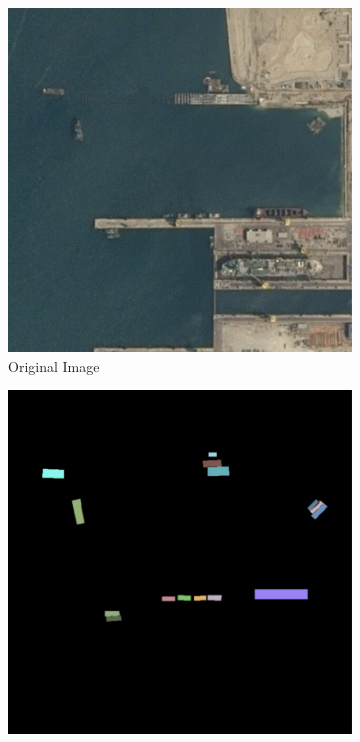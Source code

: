 \begin{figure}[h]
    \newcommand{\CategoricalAccuracyImageWidth}{0.3\textwidth}

    \centering
    \hfill
    \begin{subfigure}{\CategoricalAccuracyImageWidth}
        \includegraphics[width=\textwidth]{images/categorical_accuracy_image}
        \caption{Original Image}
        \label{fig:ca_image}
    \end{subfigure}
    \hfill
    \begin{subfigure}{\CategoricalAccuracyImageWidth}
        \includegraphics[width=\textwidth]{images/categorical_accuracy_label}

\end{subfigure}
\end{figure}
